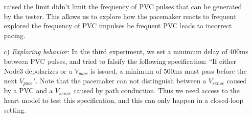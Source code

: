 %
%

raised the limit didn't limit the frequency of PVC pulses that can be generated by the tester. 
This allows us to explore how the pacemaker reacts to frequent explored the frequency of PVC impulses be frequent PVC leads to incorrect pacing.

c) \emph{Exploring behavior}: In the third experiment, we set a minimum delay of 400ms between PVC pulses, and tried to falsify the following specification:
``If either Node3 depolarizes or a $V_{pace}$ is issued, a minimum of 500ms must pass before the next $V_{pace}$".
Note that the pacemaker can not distinguish between a $V_{sense}$ caused by a PVC and a $V_{sense}$ caused by path conduction.
Thus we need access to the heart model to test this specification, and this can only happen in a closed-loop setting.


